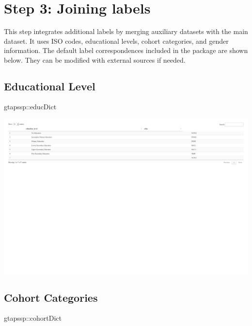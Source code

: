 \documentclass[
  letterpaper,
  DIV=11,
  numbers=noendperiod]{scrartcl}
\newenvironment{Shaded}{}{}
\newcommand{\NormalTok}[1]{\textcolor[rgb]{0.12,0.11,0.11}{#1}}
\newcommand{\SpecialCharTok}[1]{\textcolor[rgb]{0.24,0.68,0.91}{#1}}
\begin{document}
\section{Step 3: Joining labels}\label{step-3-joining-labels}

This step integrates additional labels by merging auxiliary datasets
with the main dataset. It uses ISO codes, educational levels, cohort
categories, and gender information. The default label correspondences
included in the package are shown below. They can be modified with
external sources if needed.

\subsection{Educational Level}

\begin{Shaded}
\begin{Highlighting}[]
\NormalTok{gtapssp}\SpecialCharTok{::}\NormalTok{educDict}
\end{Highlighting}
\end{Shaded}

\includegraphics{index_files/figure-pdf/unnamed-chunk-14-1.pdf}

\subsection{Cohort Categories}

\begin{Shaded}
\begin{Highlighting}[]
\NormalTok{gtapssp}\SpecialCharTok{::}\NormalTok{cohortDict}
\end{Highlighting}
\end{Shaded}
\end{document}
